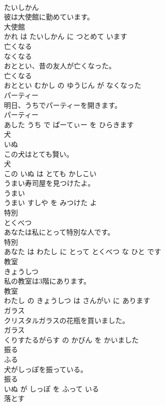 \documentclass[8pt]{extreport}
\begin{document}
\begin{CJK}{UTF8}{min}
\\	たいしかん			
\\	彼は大使館に勤めています。	
\\	大使館 
\\	かれ は たいしかん に つとめて います			
\\	亡くなる	
\\	なくなる			
\\	おととい、昔の友人が亡くなった。	
\\	亡くなる 
\\	おととい むかし の ゆうじん が なくなった			
\\	パーティー	
\\	明日、うちでパーティーを開きます。	
\\	パーティー 
\\	あした うち で ぱーてぃー を ひらきます			
\\	犬	
\\	いぬ			
\\	この犬はとても賢い。	
\\	犬 
\\	この いぬ は とても かしこい			
\\	うまい寿司屋を見つけたよ。	
\\	うまい 
\\	うまい すしや を みつけた よ			
\\	特別	
\\	とくべつ			
\\	あなたは私にとって特別な人です。	
\\	特別 
\\	あなた は わたし に とって とくべつ な ひと です			
\\	教室	
\\	きょうしつ			
\\	私の教室は3階にあります。	
\\	教室 
\\	わたし の きょうしつ は さんがい に あります			
\\	ガラス	
\\	クリスタルガラスの花瓶を買いました。	
\\	ガラス 
\\	くりすたるがらす の かびん を かいました			
\\	振る	
\\	ふる			
\\	犬がしっぽを振っている。	
\\	振る 
\\	いぬ が しっぽ を ふって いる			
\\	落とす	

\end{CJK}
\end{document}
